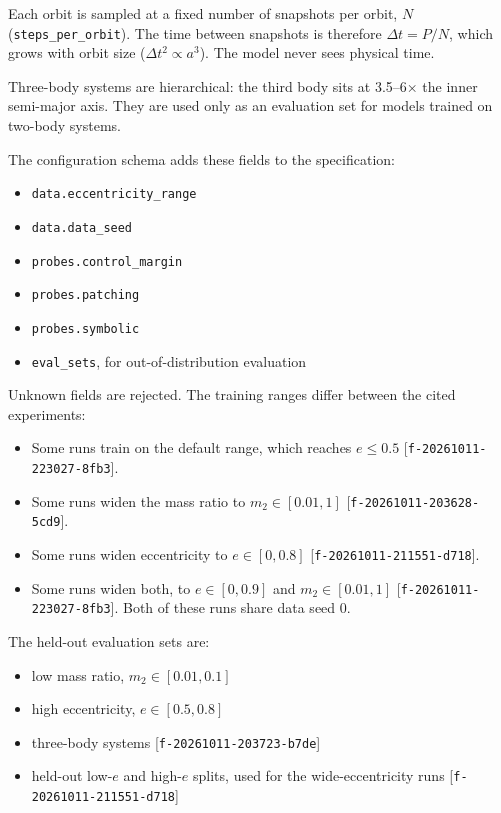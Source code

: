 \documentclass{article}
\begin{document}
Each orbit is sampled at a fixed number of snapshots per orbit, $N$ (\texttt{steps\_per\_orbit}). The time between snapshots is therefore $\Delta t = P/N$, which grows with orbit size ($\Delta t^2 \propto a^3$). The model never sees physical time.

Three-body systems are hierarchical: the third body sits at 3.5–6× the inner semi-major axis. They are used only as an evaluation set for models trained on two-body systems.

The configuration schema adds these fields to the specification:

\begin{itemize}
\item \texttt{data.eccentricity\_range}
\item \texttt{data.data\_seed}
\item \texttt{probes.control\_margin}
\item \texttt{probes.patching}
\item \texttt{probes.symbolic}
\item \texttt{eval\_sets}, for out-of-distribution evaluation
\end{itemize}

Unknown fields are rejected. The training ranges differ between the cited experiments:

\begin{itemize}
\item Some runs train on the default range, which reaches $e \leq 0.5$ [\texttt{f-20261011-223027-8fb3}].
\item Some runs widen the mass ratio to $m_2 \in [0.01, 1]$ [\texttt{f-20261011-203628-5cd9}].
\item Some runs widen eccentricity to $e \in [0, 0.8]$ [\texttt{f-20261011-211551-d718}].
\item Some runs widen both, to $e \in [0, 0.9]$ and $m_2 \in [0.01, 1]$ [\texttt{f-20261011-223027-8fb3}]. Both of these runs share data seed 0.
\end{itemize}

The held-out evaluation sets are:

\begin{itemize}
\item low mass ratio, $m_2 \in [0.01, 0.1]$
\item high eccentricity, $e \in [0.5, 0.8]$
\item three-body systems [\texttt{f-20261011-203723-b7de}]
\item held-out low-$e$ and high-$e$ splits, used for the wide-eccentricity runs [\texttt{f-20261011-211551-d718}]
\end{itemize}
\end{document}
